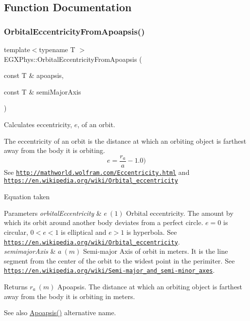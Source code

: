 \subsection{Function Documentation}
\mbox{\label{group___e_g_x_phys-_eccentricity_gad0a4e49f20aeb01bd7d4c6b6171f7732}} 
\subsubsection{\texorpdfstring{Orbital\+Eccentricity\+From\+Apoapsis()}{OrbitalEccentricityFromApoapsis()}}
{\footnotesize\ttfamily template$<$typename T $>$ \\
E\+G\+X\+Phys\+::\+Orbital\+Eccentricity\+From\+Apoapsis (\begin{DoxyParamCaption}\item[{const T \&}]{apoapsis,  }\item[{const T \&}]{semi\+Major\+Axis }\end{DoxyParamCaption})}



Calculates eccentricity, $e$, of an orbit. 

The eccentricity of an orbit is the distance at which an orbiting object is farthest away from the body it is orbiting. \[e = \frac{r_a}{a}-1.0)\] See \href{http://mathworld.wolfram.com/Eccentricity.html}{\tt http\+://mathworld.\+wolfram.\+com/\+Eccentricity.\+html} and \href{https://en.wikipedia.org/wiki/Orbital_eccentricity}{\tt https\+://en.\+wikipedia.\+org/wiki/\+Orbital\+\_\+eccentricity}

Equation taken


\begin{DoxyParams}{Parameters}
{\em orbital\+Eccentricity} & $e\ (1)$ Orbital eccentricity. The amount by which its orbit around another body deviates from a perfect circle. $e=0$ is circular, $ 0<e<1$ is elliptical and $e>1$ is hyperbola. See \href{https://en.wikipedia.org/wiki/Orbital_eccentricity}{\tt https\+://en.\+wikipedia.\+org/wiki/\+Orbital\+\_\+eccentricity}. \\
\hline
{\em semimajor\+Axis} & $a\ (m)$ Semi-\/major Axis of orbit in meters. It is the line segment from the center of the orbit to the widest point in the perimiter. See \href{https://en.wikipedia.org/wiki/Semi-major_and_semi-minor_axes}{\tt https\+://en.\+wikipedia.\+org/wiki/\+Semi-\/major\+\_\+and\+\_\+semi-\/minor\+\_\+axes}. \\
\hline
\end{DoxyParams}
\begin{DoxyReturn}{Returns}
$r_a\ (m)$ Apoapsis. The distance at which an orbiting object is farthest away from the body it is orbiting in meters. 
\end{DoxyReturn}
\begin{DoxySeeAlso}{See also}
\hyperlink{group___e_g_x_phys-_apoapsis_gaf962e650bf84a568458e8eb39b1c61ba}{Apoapsis()} alternative name. 
\end{DoxySeeAlso}
